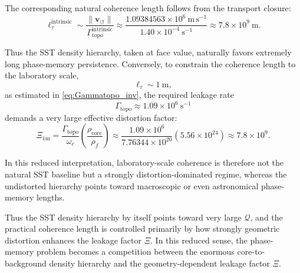 \documentclass[11pt]{article}
\newcommand{\vnorm}{\lVert \mathbf{v}_{\!\boldsymbol{\circlearrowleft}}\rVert}
\newcommand{\rhocore}{\rho_{\text{core}}}
\begin{document}
        The corresponding natural coherence length follows from the transport closure:
        \begin{equation}
            \ell_\tau^{\mathrm{intrinsic}}
            \sim
            \frac{\vnorm}{\Gamma_{\mathrm{topo}}^{\mathrm{intrinsic}}}
            \approx
            \frac{1.09384563\times 10^6\ \mathrm{m\,s^{-1}}}{1.40\times 10^{-4}\ \mathrm{s^{-1}}}
            \approx
            7.8\times 10^9\ \mathrm{m}.
            \label{eq:l_tau_intrinsic}
        \end{equation}

        Thus the SST density hierarchy, taken at face value, naturally favors extremely long phase-memory persistence. Conversely, to constrain the coherence length to the laboratory scale,
        \[
            \ell_\tau \sim 1\ \mathrm{m},
        \]
        as estimated in \cref{eq:Gammatopo_inv}, the required leakage rate
        \[
            \Gamma_{\mathrm{topo}} \approx 1.09\times 10^6\ \mathrm{s^{-1}}
        \]
        demands a very large effective distortion factor:
        \begin{equation}
            \Xi_{1\mathrm{m}}
            =
            \frac{\Gamma_{\mathrm{topo}}}{\omega_c}\left(\frac{\rhocore}{\rho_{\!f}}\right)
            \approx
            \frac{1.09\times 10^6}{7.76344\times 10^{20}}
            \left(5.56\times 10^{24}\right)
            \approx
            7.8\times 10^9.
            \label{eq:Xi_1m}
        \end{equation}

        In this reduced interpretation, laboratory-scale coherence is therefore not the natural SST baseline but a strongly distortion-dominated regime, whereas the undistorted hierarchy points toward macroscopic or even astronomical phase-memory lengths.

        Thus the SST density hierarchy by itself points toward very large \(\mathcal{Q}\), and the practical coherence length is controlled primarily by how strongly geometric distortion enhances the leakage factor \(\Xi\). In this reduced sense, the phase-memory problem becomes a competition between the enormous core-to-background density hierarchy and the geometry-dependent leakage factor \(\Xi\).
\end{document}
